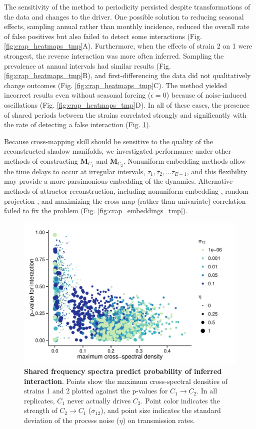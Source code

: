 \documentclass[10pt]{article}
\begin{document}
The sensitivity of the method to periodicity persisted despite transformations of the data and changes to the  driver. 
One possible solution to reducing seasonal effects, sampling annual rather than monthly incidence, reduced the overall rate of false positives but also failed to detect some interactions (Fig. \ref{fig:crap_heatmaps_tmp}A).
Furthermore, when the effects of strain 2 on 1 were strongest, the reverse interaction was more often inferred.
Sampling the prevalence at annual intervals had similar results (Fig. \ref{fig:crap_heatmaps_tmp}B), and first-differencing the data did not qualitatively change outcomes (Fig. \ref{fig:crap_heatmaps_tmp}C).
The method yielded incorrect results even without seasonal forcing ($\epsilon=0$) because of noise-induced oscillations (Fig. \ref{fig:crap_heatmaps_tmp}D).
In all of these cases, the presence of shared periods between the strains correlated strongly and significantly with the rate of detecting a false interaction (Fig. \ref{fig:max_crossspec_tmp}).

Because cross-mapping skill should be sensitive to the quality of the reconstructed shadow manifolds, we investigated performance under other methods of constructing $\textbf{M}_{C_1}$ and $\textbf{M}_{C_2}$.
Nonuniform embedding methods allow the time delays to occur at irregular intervals, $\tau_1, \tau_2, ... \tau_{E-1}$, and this flexibility may provide a more parsimonious embedding of the dynamics.
Alternative methods of attractor reconstruction, including nonuniform embedding \cite{Nichkawde2013, Uzal2011}, random projection \cite{Tajima2015}, and maximizing the cross-map (rather than univariate) correlation failed to fix the problem (Fig. \ref{fig:crap_embeddings_tmp}).

\begin{figure}
\begin{center}
  \includegraphics[width=5in]{dataflow/out/fig_spectra/fig_spectra.pdf}
  \end{center}
  \caption{\textbf{Shared frequency spectra predict probability of inferred interaction}. Points show the maximum cross-spectral densities of strains 1 and 2 plotted against the p-values for $C_1 \rightarrow C_2$. In all replicates, $C_1$ never actually drives $C_2$. Point color indicates the strength of $C_2 \rightarrow C_1$ ($\sigma_{12}$), and point size indicates the standard deviation of the process noise ($\eta$) on transmission rates. \label{fig:max_crossspec_tmp}} 
\end{figure}
\end{document}
